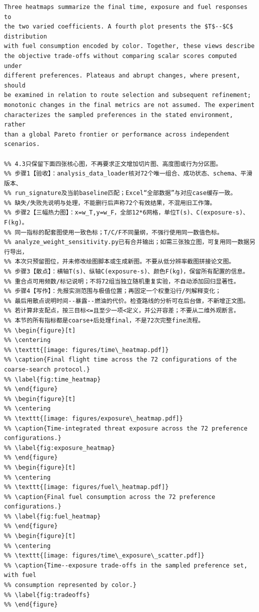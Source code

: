 \documentclass[12pt]{article}
\begin{document}
\begin{verbatim}
Three heatmaps summarize the final time, exposure and fuel responses to
the two varied coefficients. A fourth plot presents the $T$--$C$ distribution
with fuel consumption encoded by color. Together, these views describe
the objective trade-offs without comparing scalar scores computed under
different preferences. Plateaus and abrupt changes, where present, should
be examined in relation to route selection and subsequent refinement;
monotonic changes in the final metrics are not assumed. The experiment
characterizes the sampled preferences in the stated environment, rather
than a global Pareto frontier or performance across independent scenarios.

%% 4.3只保留下面四张核心图，不再要求正文增加切片图、高度图或行为分区图。
%% 步骤1【验收】：analysis_data_loader核对72个唯一组合、成功状态、schema、平滑版本、
%% run_signature及当前baseline匹配；Excel“全部数据”与对应case缓存一致。
%% 缺失/失败先说明与处理，不能删行后声称72个有效结果，不混用旧工作簿。
%% 步骤2【三幅热力图】：x=w_T,y=w_F，全部12*6网格，单位T(s)、C(exposure-s)、F(kg)。
%% 同一指标的配套图使用一致色标；T/C/F不同量纲，不强行使用同一数值色标。
%% analyze_weight_sensitivity.py已有合并输出；如需三张独立图，可复用同一数据另行导出，
%% 本次只预留图位，并未修改绘图脚本或生成新图。不要从低分辨率截图拼接论文图。
%% 步骤3【散点】：横轴T(s)、纵轴C(exposure-s)、颜色F(kg)，保留所有配置的信息。
%% 重合点可用频数/标记说明；不将72组当独立随机重复实验，不自动添加回归显著性。
%% 步骤4【写作】：先报实测范围与极值位置；再固定一个权重沿行/列解释变化；
%% 最后用散点说明时间--暴露--燃油的代价。检查路线的分析可在后台做，不新增正文图。
%% 若计算非支配点，按三目标<=且至少一项<定义，并公开容差；不要从二维外观断言。
%% 本节的所有指标都是coarse+后处理final，不是72次完整fine流程。
%% \begin{figure}[t]
%% \centering
%% \texttt{[image: figures/time\_heatmap.pdf]}
%% \caption{Final flight time across the 72 configurations of the coarse-search protocol.}
%% \label{fig:time_heatmap}
%% \end{figure}
%% \begin{figure}[t]
%% \centering
%% \texttt{[image: figures/exposure\_heatmap.pdf]}
%% \caption{Time-integrated threat exposure across the 72 preference configurations.}
%% \label{fig:exposure_heatmap}
%% \end{figure}
%% \begin{figure}[t]
%% \centering
%% \texttt{[image: figures/fuel\_heatmap.pdf]}
%% \caption{Final fuel consumption across the 72 preference configurations.}
%% \label{fig:fuel_heatmap}
%% \end{figure}
%% \begin{figure}[t]
%% \centering
%% \texttt{[image: figures/time\_exposure\_scatter.pdf]}
%% \caption{Time--exposure trade-offs in the sampled preference set, with fuel
%% consumption represented by color.}
%% \label{fig:tradeoffs}
%% \end{figure}


\end{verbatim}
\end{document}
